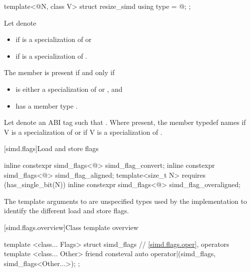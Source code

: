 \begin{itemdecl}
template<@\simdsizetype@ N, class V> struct resize_simd { using type = @\seebelow@; };
\end{itemdecl}

\begin{itemdescr}
  \pnum Let  denote
  \begin{itemize}
    \item {} if  is a specialization of
       or
    \item {} if  is a
      specialization of .
  \end{itemize}

  \pnum
  The member  is present if and only if
  \begin{itemize}
    \item {} is either a specialization of  or
      , and
    \item {} has a member type .
  \end{itemize}

  \pnum
  Let  denote an ABI tag such that .
  Where present, the member typedef  names  if \tcode V is a specialization of  or
   if \tcode V is a specialization of
  .
\end{itemdescr}

[simd.flags]{Load and store flags}

\begin{itemdecl}
inline constexpr simd_flags<@\seebelow@> simd_flag_convert{};
inline constexpr simd_flags<@\seebelow@> simd_flag_aligned{};
template<size_t N> requires (has_single_bit(N))
  inline constexpr simd_flags<@\seebelow@> simd_flag_overaligned{};
\end{itemdecl}

\begin{itemdescr}
  \pnum
  The template arguments to  are unspecified types used
  by the implementation to identify the different load and store flags.
\end{itemdescr}

[simd.flags.overview]{Class template  overview}

\begin{codeblock}
template <class... Flags> struct simd_flags {
  // \ref{simd.flags.oper},  operators
  template <class... Other>
    friend consteval auto operator|(simd_flags, simd_flags<Other...>);
};
\end{codeblock}

